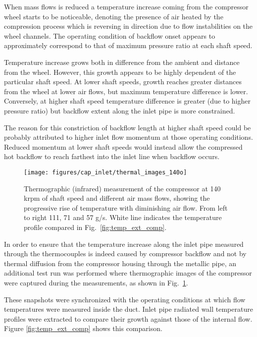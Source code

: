 When mass flows is reduced a temperature increase coming from the compressor wheel starts to be noticeable, denoting the presence of air heated by the compression process which is reversing in direction due to flow instabilities on the wheel channels. The operating condition of backflow onset appears to approximately correspond to that of maximum pressure ratio at each shaft speed.

Temperature increase grows both in difference from the ambient and distance from the wheel. However, this growth appears to be highly dependent of the particular shaft speed. At lower shaft speeds, growth reaches greater distances from the wheel at lower air flows, but maximum temperature difference is lower. Conversely, at higher shaft speed temperature difference is greater (due to higher pressure ratio) but backflow extent along the inlet pipe is more constrained.

The reason for this constriction of backflow length at higher shaft speed could be probably attributed to higher inlet flow momentum at those operating conditions. Reduced momentum at lower shaft speeds would instead allow the compressed hot backflow to reach farthest into the inlet line when backflow occurs.

\begin{figure}[!htb]
\centering
\texttt{[image: figures/cap\_inlet/thermal\_images\_140o]}
\caption[Exterior thermographic measurements]{Thermographic (infrared) measurement of the compressor at 140 krpm of shaft speed and different air mass flows, showing the progressive rise of temperature with diminishing air flow. From left to right 111, 71 and 57 g/s. White line indicates the temperature profile compared in Fig.~\ref{fig:temp_ext_comp}.}
\label{fig:thermal_images}
\end{figure}

In order to ensure that the temperature increase along the inlet pipe measured through the thermocouples is indeed caused by compressor backflow and not by thermal diffusion from the compressor housing through the metallic pipe, an additional test run was performed where thermographic images of the compressor were captured during the measurements, as shown in Fig.~\ref{fig:thermal_images}.

These snapshots were synchronized with the operating conditions at which flow temperatures were measured inside the duct. Inlet pipe radiated wall temperature profiles were extracted to compare their growth against those of the internal flow. Figure \ref{fig:temp_ext_comp} shows this comparison.

